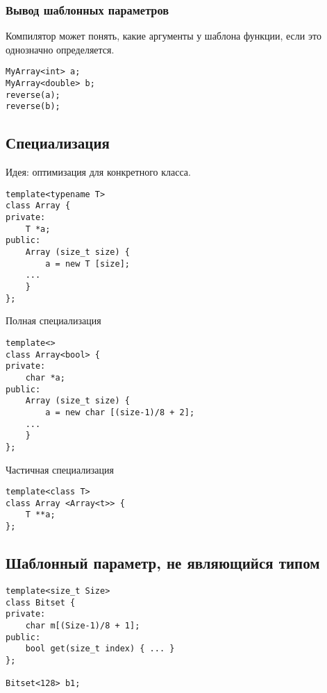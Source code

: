 \subsubsection{Вывод шаблонных параметров}
Компилятор может понять, какие аргументы у шаблона функции, если это однозначно определяется.
\begin{verbatim}
MyArray<int> a;
MyArray<double> b;
reverse(a);
reverse(b);
\end{verbatim}
\subsection{Специализация}
Идея: оптимизация для конкретного класса.
\begin{verbatim}
template<typename T>
class Array {
private:
    T *a;
public:
    Array (size_t size) {
        a = new T [size];
	...
    }
};
\end{verbatim}
Полная специализация
\begin{verbatim}
template<>
class Array<bool> {
private:
    char *a;
public:
    Array (size_t size) {
        a = new char [(size-1)/8 + 2];
	...
    }
};
\end{verbatim}
Частичная специализация
\begin{verbatim}
template<class T>
class Array <Array<t>> {
    T **a;
};
\end{verbatim}
\subsection{Шаблонный параметр, не являющийся типом}
\begin{verbatim}
template<size_t Size>
class Bitset {
private:
    char m[(Size-1)/8 + 1];
public:
    bool get(size_t index) { ... }
};

Bitset<128> b1;
\end{verbatim}

